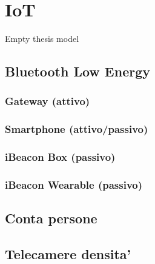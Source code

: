 \chapter{IoT}
Empty thesis model

\section{Bluetooth Low Energy}
\subsection{Gateway (attivo)}
\subsection{Smartphone (attivo/passivo)}
\subsection{iBeacon Box (passivo)}
\subsection{iBeacon Wearable (passivo)}
\section{Conta persone}
\section{Telecamere densita'}
